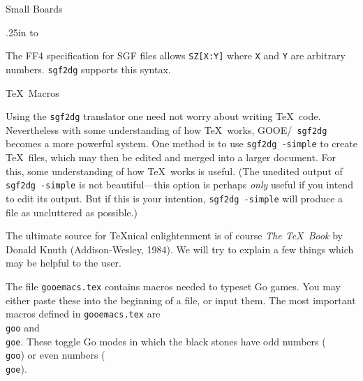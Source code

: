 \centerline{\titlefont Small Boards}
\vglue.25in
\hbox to\vskip 40pt

The FF4 specification for SGF files allows {\tt SZ[X:Y]} where {\tt X} and
{\tt Y} are arbitrary numbers.  {\tt sgf2dg} supports this syntax.

\vfil\eject
\centerline{\titlefont\TeX\ Macros}

\bigbreak
Using the {\tt sgf2dg} translator one need not worry about writing \TeX\
code. Nevertheless with some understanding of how \TeX\ works, GOOE/{\tt
sgf2dg} becomes a more powerful system. One method is to use {\tt sgf2dg
-simple} to create \TeX\ files, which may then be edited and merged into a
larger document. For this, some understanding of how \TeX\ works is useful.
(The unedited output of {\tt sgf2dg -simple} is not beautiful---this 
option is perhaps {\it only} useful if you intend to edit its output.
But if this is your intention, {\tt sgf2dg -simple} will produce a file
as uncluttered as possible.)

The ultimate source for \TeX nical enlightenment is of course
{\it The \TeX\ Book} by Donald Knuth (Addison-Wesley, 1984). We will try
to explain a few things which may be helpful to the user.

The file {\tt gooemacs.tex} contains macros needed to typeset Go games. You
may either paste these into the beginning of a file, or input them. 
The most important macros defined in {\tt gooemacs.tex} are {\tt \\goo} and
{\tt\\goe}. These toggle Go modes in which the black stones have odd numbers
({\tt \\goo}) or even numbers ({\tt \\goe}).

